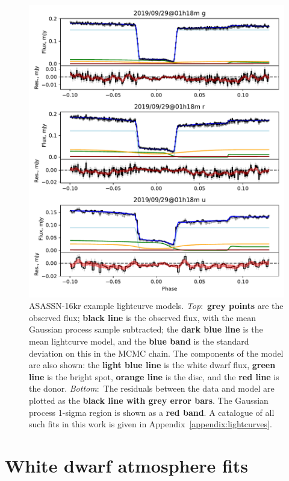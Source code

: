 \begin{figure}
    \centering
    \includegraphics[width=\textwidth]{figures/results/three_cvs_with_weird_colours/ASASSN-16kr/ASASSN-16kr_sample.pdf}
    \caption{ASASSN-16kr example lightcurve models. {\it Top}:~{\bf grey points} are the observed flux; {\bf black line} is the observed flux, with the mean Gaussian process sample subtracted; the {\bf dark blue line} is the mean lightcurve model, and the {\bf blue band} is the standard deviation on this in the MCMC chain. The components of the model are also shown: the {\bf light blue line} is the white dwarf flux, {\bf green line} is the bright spot, {\bf orange line} is the disc, and the {\bf red line} is the donor. {\it Bottom}:~The residuals between the data and model are plotted as the {\bf black line with grey error bars}. The Gaussian process 1-sigma region is shown as a {\bf red band}. A catalogue of all such fits in this work is given in Appendix~\ref{appendix:lightcurves}.}
    \label{fig:three white dwarfs:ASASSN-16kr example lightcurves}
\end{figure}


\section{White dwarf atmosphere fits}
\label{sect:three white dwarfs:method WD atmosphere fits}

